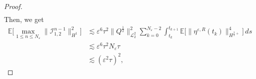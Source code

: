 \documentclass[a4paper]{amsart}
\begin{document}
\begin{proof}
\begin{align*}
   \end{align*}
   Then, we get
   \begin{align*}
        \mathbb{E}\big[\max_{1\le n\le N_\varepsilon} \|\mathcal{I}_{1,2}^{n-1} \|^2_{H^1}\big]&\lesssim\varepsilon^6 \tau^2 \|Q^{\frac{1}{2}}\|^2_{\mathcal{L}_2^2}\sum_{k=0}^{N_\varepsilon-2} \int_{t_k}^{t_{k+1}}\mathbb{E}\big[\|\eta^{\varepsilon,R}(t_k)\|^4_{H^{\frac{3}{2}+}}\big]\,ds\\
        &\lesssim \varepsilon^6 \tau^2 N_\varepsilon \tau\\
        &\lesssim(\varepsilon^2\tau)^2,
   \end{align*}

\end{proof}
\end{document}
